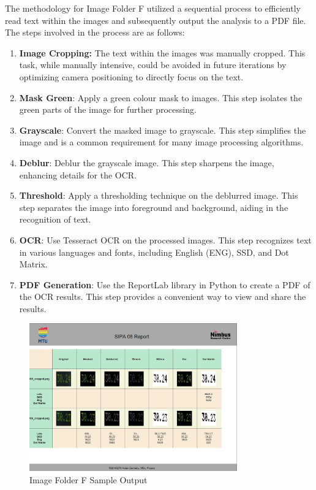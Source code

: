 The methodology for Image Folder F utilized a sequential process to efficiently read text within the images and subsequently output the analysis to a PDF file. The steps involved in the process are as follows:


\begin{enumerate}
    \item \textbf{Image Cropping:} The text within the images was manually cropped. This task, while manually intensive, could be avoided in future iterations by optimizing camera positioning to directly focus on the text.
    \item \textbf{Mask Green}: Apply a green colour mask to images. This step isolates the green parts of the image for further processing.
    \item \textbf{Grayscale}: Convert the masked image to grayscale. This step simplifies the image and is a common requirement for many image processing algorithms.
    \item \textbf{Deblur}: Deblur the grayscale image. This step sharpens the image, enhancing details for the OCR.
    \item \textbf{Threshold}: Apply a thresholding technique on the deblurred image. This step separates the image into foreground and background, aiding in the recognition of text.
    \item \textbf{OCR}: Use Tesseract OCR on the processed images. This step recognizes text in various languages and fonts, including English (ENG), SSD, and Dot Matrix.
    \item \textbf{PDF Generation}: Use the ReportLab library in Python to create a PDF of the OCR results. This step provides a convenient way to view and share the results.
\end{enumerate}

\begin{figure}[ht]
    \centering
    \includegraphics[width=0.8\textwidth]{Figures/Methodology/sipa_08/sample_output.jpg}
    \caption[Image Folder F Sample Output]{Image Folder F Sample Output}
    \label{fig:Image Folder F Sample Output}
\end{figure}


